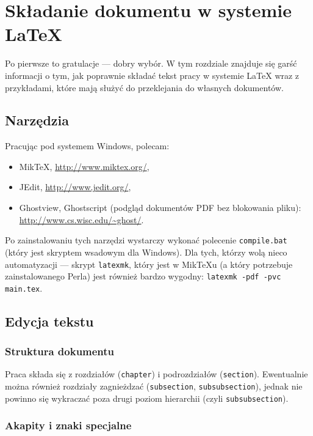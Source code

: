 \chapter{Składanie dokumentu w systemie \LaTeX}

Po pierwsze to gratulacje --- dobry wybór. W tym rozdziale znajduje się
garść informacji o tym, jak poprawnie składać tekst pracy w systemie \LaTeX{} wraz z
przykładami, które mają służyć do przeklejania do własnych dokumentów.

\section{Narzędzia}
Pracując pod systemem Windows, polecam:
\begin{itemize}
    \item MikTeX, \url{http://www.miktex.org/},
    \item JEdit, \url{http://www.jedit.org/},
    \item Ghostview, Ghostscript (podgląd dokumentów PDF bez blokowania pliku):\\
    \url{http://www.cs.wisc.edu/~ghost/}.
\end{itemize}

Po zainstalowaniu tych narzędzi wystarczy wykonać polecenie \texttt{compile.bat} (który
jest skryptem wsadowym dla Windows). Dla tych, którzy wolą nieco automatyzacji --- skrypt
\texttt{latexmk}, który jest w MikTeXu (a który potrzebuje zainstalowanego Perla) jest
również bardzo wygodny: \texttt{latexmk -pdf -pvc main.tex}.

\section{Edycja tekstu}

\subsection{Struktura dokumentu}

Praca składa się z rozdziałów (\texttt{chapter}) i podrozdziałów (\texttt{section}).
Ewentualnie można również rozdziały zagnieżdzać (\texttt{subsection}, \texttt{subsubsection}),
jednak nie powinno się wykraczać poza drugi poziom hierarchii (czyli \texttt{subsubsection}).

\subsection{Akapity i znaki specjalne}

